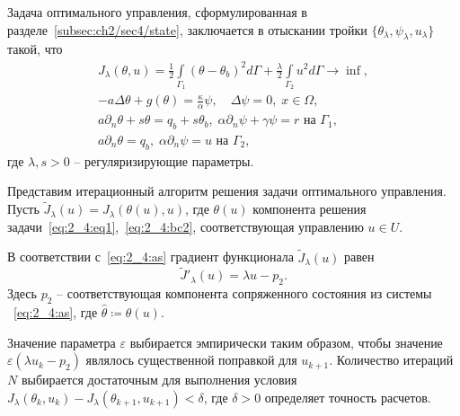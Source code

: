 Задача оптимального управления, сформулированная в разделе~\ref{subsec:ch2/sec4/state},
заключается в отыскании тройки $\{\theta_\lambda,\psi_\lambda,u_\lambda\}$ такой, что
\begin{gather*}
    J_\lambda(\theta, u) =
    \frac{1}{2} \int \limits_{\Gamma_1} (\theta - \theta_b)^2 d \Gamma
    + \frac{\lambda}{2}\int\limits_{\Gamma_2} u^2 d\Gamma \rightarrow \inf, \\
    - a \Delta \theta + g (\theta) = \frac{\kappa}{\alpha}\psi, \quad
    \Delta \psi = 0, \; x \in \Omega, \\
    a \partial_n \theta + s \theta = q_b + s \theta_b,
    \; \alpha \partial_n \psi + \gamma \psi = r
    \text{ на } \Gamma_1,\\
    a \partial_n \theta = q_b, \;
    \alpha \partial_n \psi = u \text{ на } \Gamma_2,
\end{gather*}
где $\lambda, s > 0$ -- регуляризирующие параметры.


Представим итерационный алгоритм решения задачи оптимального управления.
Пусть $\tilde J_\lambda(u)=J_\lambda(\theta(u), u)$,
где $\theta(u)$ компонента решения
задачи~\eqref{eq:2_4:eq1},~\eqref{eq:2_4:bc2}, соответствующая управлению $u\in U$.

В соответствии с~\eqref{eq:2_4:as} градиент функционала $\tilde J_\lambda(u)$ равен
\[ \tilde J'_\lambda (u) = \lambda u - p_2. \]
Здесь $p_2$ -- соответствующая компонента сопряженного состояния из системы ~\eqref{eq:2_4:as},
где $\hat{\theta}\coloneqq\theta(u)$.

Значение параметра $\varepsilon$ выбирается эмпирически таким образом, чтобы значение
$\varepsilon (\lambda u_k - p_2)$ являлось существенной поправкой для $u_{k+1}$.
Количество итераций $N$ выбирается достаточным для выполнения условия
$J_\lambda(\theta_k, u_k) - J_\lambda(\theta_{k+1}, u_{k+1}) < \delta$, где $\delta > 0$
определяет точность расчетов.

